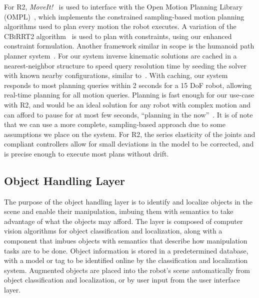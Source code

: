 For R2, \textit{MoveIt!}~\cite{chitta2012moveit} is used to interface with the Open Motion Planning Library (OMPL)~\cite{Sucan2012}, which implements the constrained sampling-based motion planning algorithms used to plan every motion the robot executes.
A variation of the \textsc{CBiRRT2} algorithm~\cite{Berenson2011} is used to plan with constraints, using our enhanced constraint formulation.
Another framework similar in scope is the humanoid path planner system~\cite{Mirabel2016}.
For our system inverse kinematic solutions are cached in a nearest-neighbor structure to speed query resolution time by seeding the solver with known nearby configurations, similar to~\cite{Hauser2016}.
With caching, our system responds to most planning queries within 2 seconds for a 15 DoF robot, allowing real-time planning for all motion queries.
Planning is fast enough for our use-case with R2, and would be an ideal solution for any robot with complex motion and can afford to pause for at most few seconds, ``planning in the now''~\cite{kaelbling2011hierarchical-task-and-motion-planning}.
It is of note that we can use a more complete, sampling-based approach due to some assumptions we place on the system.
For R2, the series elasticity of the joints and compliant controllers allow for small deviations in the model to be corrected, and is precise enough to execute most plans without drift.


\subsection{Object Handling Layer}
The purpose of the object handling layer is to identify and localize objects in the scene and enable their manipulation, imbuing them with semantics to take advantage of what the objects may afford.
The layer is composed of computer vision algorithms for object classification and localization, along with a component that imbues objects with semantics that describe how manipulation tasks are to be done.
Object information is stored in a predetermined database, with a model or tag to be identified online by the classification and localization system.
Augmented objects are placed into the robot's scene automatically from object classification and localization, or by user input from the user interface layer.


